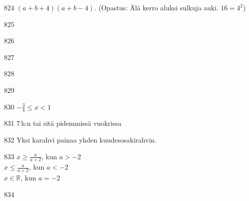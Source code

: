 \begin{Vastaus}{824}
		$(a+b+4)(a+b-4)$. (Opastus: Älä kerro aluksi sulkuja auki. $16=4^2$)
    
\end{Vastaus}
\begin{Vastaus}{825}
    
\end{Vastaus}
\begin{Vastaus}{826}
    
\end{Vastaus}
\begin{Vastaus}{827}
    
\end{Vastaus}
\begin{Vastaus}{828}
    
\end{Vastaus}
\begin{Vastaus}{829}
    
\end{Vastaus}
\begin{Vastaus}{830}
        $-\frac{3}{4} \leq x < 1$
    
\end{Vastaus}
\begin{Vastaus}{831}
	$7$\,h:n tai sitä pidemmissä vuokrissa
    
\end{Vastaus}
\begin{Vastaus}{832}
			Yksi karahvi painaa yhden kuudesosakirahvin.
	
\end{Vastaus}
\begin{Vastaus}{833}
        $x \geq \frac{a}{a+2}$, kun $a > -2$ \\
        $x \leq \frac{a}{a+2}$, kun $a < -2$ \\
    $x \in \mathbb{R}$, kun $a = -2$ \\
	
\end{Vastaus}
\begin{Vastaus}{834}
    
\end{Vastaus}
